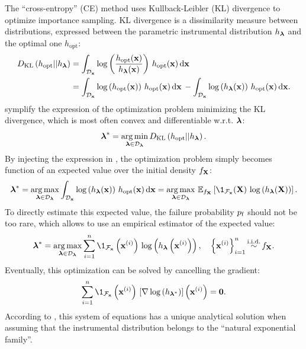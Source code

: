 The ``cross-entropy'' (CE) method uses Kullback-Leibler (KL) divergence to optimize importance sampling. 
KL divergence is a dissimilarity measure between distributions, expressed between the parametric instrumental distribution $h_{\boldsymbol{\lambda}}$ and the optimal one $h_{\mathrm{opt}}$: 
\begin{subequations}
    \begin{align}
        D_{\mathrm{KL}}\left(h_{\mathrm{opt}} || h_{\boldsymbol{\lambda}}\right) &= \int_{\mathcal{D}_{\bf x}} \log \left(\frac{h_{\mathrm{opt}}({\bf x})}{h_{\boldsymbol{\lambda}}({\bf x})}\right) \, h_{\mathrm{opt}}({\bf x}) \, \mathrm{d} {\bf x}\\
            &= \int_{\mathcal{D}_{\bf x}} \log\left(h_{\mathrm{opt}}({\bf x})\right) \, h_{\mathrm{opt}}({\bf x}) \, \mathrm{d} {\bf x} \, - \int_{\mathcal{D}_{\bf x}} \log\left(h_{\boldsymbol{\lambda}}({\bf x})\right) \, h_{\mathrm{opt}}({\bf x}) \, \mathrm{d} {\bf x}.
    \label{eq:KL}
    \end{align}
\end{subequations}
\citet{rubinstein_2004_CE} symplify the expression of the optimization problem minimizing the KL divergence, which is most often convex and differentiable w.r.t. ${\boldsymbol{\lambda}}$:  
\begin{equation}
    {\boldsymbol{\lambda}}^* = \operatorname*{arg\,min}_{{\boldsymbol{\lambda}} \in \mathcal{D}_{\boldsymbol{\lambda}}} D_{\mathrm{KL}}\left(h_{\mathrm{opt}} || h_{\boldsymbol{\lambda}}\right). 
\end{equation}
By injecting the expression in , the optimization problem simply becomes function of an expected value over the initial density $f_{\bf X}$:
\begin{equation}
    \blambda^* = \argmax_{\blambda \in \iD_\blambda} \int_{\iD_\bx} \log\left(h_\blambda(\bx)\right) \, h_{\mathrm{opt}}(\bx) \, \dd \bx
                = \argmax_{\blambda \in \iD_\blambda} \, \E_{f_\bX}\left[\1_{\iF_\bx}(\bX) \, \log\left(h_\blambda(\bX)\right) \right].
    \label{eq:empirical_KL}
\end{equation}
To directly estimate this expected value, the failure probability $p_\mathrm{f}$ should not be too rare, which allows to use an empirical estimator of the expected value:
\begin{equation}
        \blambda^* = \argmax_{\blambda \in \iD_\blambda} \sum_{i=1}^{n} \1_{\iF_\bx}\left(\bx^{(i)}\right) \, \log\left(h_\blambda\left(\bx^{(i)}\right)\right), \quad \left\{ \bx^{(i)} \right\}_{i=1}^n \simiid f_\bX.
\end{equation}
Eventually, this optimization can be solved by cancelling the gradient: 
\begin{equation}
    \sum_{i=1}^{n} \1_{\iF_\bx}\left(\bx^{(i)}\right) \, \left[\nabla \log\left(h_{\blambda^*}\right)\right]\left(\bx^{(i)}\right) = \mathbf{0}.
\end{equation}
According to \citet{rubinstein_2004_CE}, this system of equations has a unique analytical solution when assuming that the instrumental distribution belongs to the ``natural exponential family''. 

